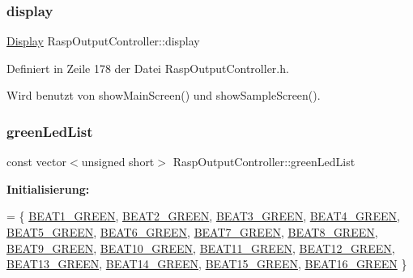\mbox{\label{class_rasp_output_controller_a0bb52cfee18c44cd2ed64dea27d5ccc4}} 
\subsubsection{\texorpdfstring{display}{display}}
{\footnotesize\ttfamily \hyperlink{class_display}{Display} Rasp\+Output\+Controller\+::display\hspace{0.3cm}{\ttfamily [private]}}



Definiert in Zeile 178 der Datei Rasp\+Output\+Controller.\+h.



Wird benutzt von show\+Main\+Screen() und show\+Sample\+Screen().

\mbox{\label{class_rasp_output_controller_a8b888abfd8719eb95568abaf53d68d5c}} 
\subsubsection{\texorpdfstring{green\+Led\+List}{greenLedList}}
{\footnotesize\ttfamily const vector$<$unsigned short$>$ Rasp\+Output\+Controller\+::green\+Led\+List\hspace{0.3cm}{\ttfamily [private]}}

{\bfseries Initialisierung\+:}
\begin{DoxyCode}
= \{
            \hyperlink{namespaceoutputs_ad934b2db0cff1421ca84b300dc257508}{BEAT1\_GREEN}, \hyperlink{namespaceoutputs_ad2dc5e7bf8fd1c9ffa64cf8efdb0035a}{BEAT2\_GREEN}, \hyperlink{namespaceoutputs_a95e392d21973d605abcc9efc19dce314}{BEAT3\_GREEN}, 
      \hyperlink{namespaceoutputs_afd9270436632213bade739dbc4f6c8f6}{BEAT4\_GREEN}, \hyperlink{namespaceoutputs_a4b1e0d3ad2b80752a68cdec9a73f5ac6}{BEAT5\_GREEN}, \hyperlink{namespaceoutputs_a55c3bd8cf6cdffbd199abc9ae5a0e1ac}{BEAT6\_GREEN}, 
      \hyperlink{namespaceoutputs_a971ea0c6742c83be5634cbf533cfb050}{BEAT7\_GREEN}, \hyperlink{namespaceoutputs_a6fe56e04e6ce7835262e2a60df0506d6}{BEAT8\_GREEN},
            \hyperlink{namespaceoutputs_a0600b91e575643cfee3eb9e9e5b14839}{BEAT9\_GREEN}, \hyperlink{namespaceoutputs_ab0b662f329ea65f6f5fc1acba70fbd07}{BEAT10\_GREEN}, \hyperlink{namespaceoutputs_a38945c3c9766ee86e3c97a79e2be45c1}{BEAT11\_GREEN}, 
      \hyperlink{namespaceoutputs_a863de14249bb5dd32b6fb2dd665f804e}{BEAT12\_GREEN}, \hyperlink{namespaceoutputs_a3410f51b9ac465ad73e71e8bd54b3ab4}{BEAT13\_GREEN}, \hyperlink{namespaceoutputs_a181a1c13a2964de30df1c57bae8f8428}{BEAT14\_GREEN}, 
      \hyperlink{namespaceoutputs_afacd3fd74ab006d3ce548b672c3ab2f7}{BEAT15\_GREEN},
            \hyperlink{namespaceoutputs_abb8efcc194a9934c26026a359edc8929}{BEAT16\_GREEN}
    \}
\end{DoxyCode}



